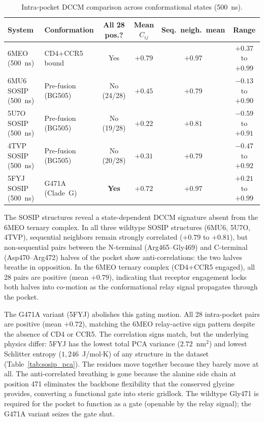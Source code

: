 \documentclass[11pt,a4paper]{article}
\begin{document}
\begin{table}[h]
\centering
\caption{Intra-pocket DCCM comparison across conformational states (500~ns).}
\label{tab:sosip_dccm}
\small
\begin{tabular}{@{}ll c c c c@{}}
\hline
System & Conformation & All 28 pos.? & Mean $C_{ij}$ & Seq.\ neigh.\ mean & Range \\
\hline
6MEO (500~ns) & CD4+CCR5 bound & Yes & $+0.79$ & $+0.97$ & $+0.37$ to $+0.99$ \\
6MU6 SOSIP (500~ns) & Pre-fusion (BG505) & No (24/28) & $+0.45$ & $+0.79$ & $-0.13$ to $+0.90$ \\
5U7O SOSIP (500~ns) & Pre-fusion (BG505) & No (19/28) & $+0.22$ & $+0.81$ & $-0.59$ to $+0.91$ \\
4TVP SOSIP (500~ns) & Pre-fusion (BG505) & No (20/28) & $+0.31$ & $+0.79$ & $-0.47$ to $+0.92$ \\
5FYJ SOSIP (500~ns) & G471A (Clade~G) & \textbf{Yes} & $+0.72$ & $+0.97$ & $+0.21$ to $+0.99$ \\
\hline
\end{tabular}
\end{table}

The SOSIP structures reveal a state-dependent DCCM signature absent from the 6MEO ternary complex. In all three wildtype SOSIP structures (6MU6, 5U7O, 4TVP), sequential neighbors remain strongly correlated ($+0.79$ to $+0.81$), but non-sequential pairs between the N-terminal (Arg465--Gly469) and C-terminal (Asp470--Arg472) halves of the pocket show anti-correlations: the two halves breathe in opposition. In the 6MEO ternary complex (CD4+CCR5 engaged), all 28 pairs are positive (mean $+0.79$), indicating that receptor engagement locks both halves into co-motion as the conformational relay signal propagates through the pocket.

The G471A variant (5FYJ) abolishes this gating motion. All 28 intra-pocket pairs are positive (mean $+0.72$), matching the 6MEO relay-active sign pattern despite the absence of CD4 or CCR5. The correlation signs match, but the underlying physics differ: 5FYJ has the lowest total PCA variance ($2.72$~nm$^2$) and lowest Schlitter entropy ($1{,}246$~J/mol$\cdot$K) of any structure in the dataset (Table~\ref{tab:sosip_pca}). The residues move together because they barely move at all. The anti-correlated breathing is gone because the alanine side chain at position 471 eliminates the backbone flexibility that the conserved glycine provides, converting a functional gate into steric gridlock. The wildtype Gly471 is required for the pocket to function as a gate (openable by the relay signal); the G471A variant seizes the gate shut.
\end{document}
